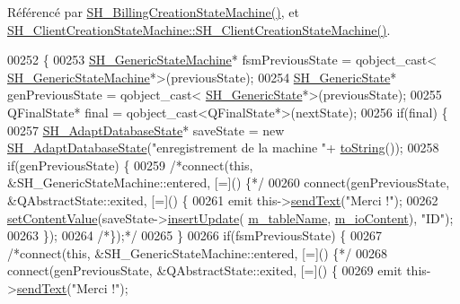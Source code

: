 Référencé par \hyperlink{classSH__BillingCreationStateMachine_ad62b77fa4aeafe200056ff3974562f83}{S\-H\-\_\-\-Billing\-Creation\-State\-Machine()}, et \hyperlink{classSH__ClientCreationStateMachine_a0b406b0f404c0fd33bf35be8ce0cc811}{S\-H\-\_\-\-Client\-Creation\-State\-Machine\-::\-S\-H\-\_\-\-Client\-Creation\-State\-Machine()}.


\begin{DoxyCode}
00252 \{
00253     \hyperlink{classSH__GenericStateMachine}{SH\_GenericStateMachine}* fsmPreviousState = qobject\_cast<
      \hyperlink{classSH__GenericStateMachine}{SH\_GenericStateMachine}*>(previousState);
00254     \hyperlink{classSH__GenericState}{SH\_GenericState}* genPreviousState = qobject\_cast<
      \hyperlink{classSH__GenericState}{SH\_GenericState}*>(previousState);
00255     QFinalState* \textcolor{keyword}{final} = qobject\_cast<QFinalState*>(nextState);
00256     \textcolor{keywordflow}{if}(\textcolor{keyword}{final}) \{
00257         \hyperlink{classSH__AdaptDatabaseState}{SH\_AdaptDatabaseState}* saveState = \textcolor{keyword}{new} 
      \hyperlink{classSH__AdaptDatabaseState}{SH\_AdaptDatabaseState}(\textcolor{stringliteral}{"enregistrement de la machine "}+
      \hyperlink{classSH__GenericStateMachine_a85c0c1c9d258ae991f84667412fa47cd}{toString}());
00258         \textcolor{keywordflow}{if}(genPreviousState) \{
00259             \textcolor{comment}{/*connect(this, &SH\_GenericStateMachine::entered, [=]() \{*/}
00260             connect(genPreviousState, &QAbstractState::exited, [=]() \{
00261                 emit this->\hyperlink{classSH__InOutStateMachine_a5e7f5958bae31696b6a8deab94ad2b4f}{sendText}(\textcolor{stringliteral}{"Merci !"});
00262                 \hyperlink{classSH__InOutStateMachine_a9ab1534306b2bdb62743d4bcefe40c17}{setContentValue}(saveState->\hyperlink{classSH__AdaptDatabaseState_a037db544ea05f42d21fcbdda758839fe}{insertUpdate}(
      \hyperlink{classSH__InOutStateMachine_aa009eecc5ab6181358faafb5996b6006}{m\_tableName}, \hyperlink{classSH__InOutStateMachine_a8cfbc27eef057bf37b7711bdfef2077e}{m\_ioContent}), \textcolor{stringliteral}{"ID"});
00263             \});
00264             \textcolor{comment}{/*\});*/}
00265         \}
00266         \textcolor{keywordflow}{if}(fsmPreviousState) \{
00267             \textcolor{comment}{/*connect(this, &SH\_GenericStateMachine::entered, [=]() \{*/}
00268             connect(genPreviousState, &QAbstractState::exited, [=]() \{
00269                 emit this->\hyperlink{classSH__InOutStateMachine_a5e7f5958bae31696b6a8deab94ad2b4f}{sendText}(\textcolor{stringliteral}{"Merci !"});

\end{DoxyCode}
